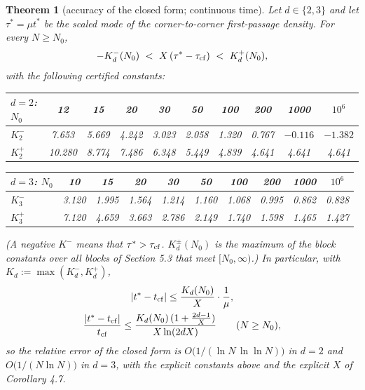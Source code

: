 \documentclass[11pt,a4paper]{article}
\newtheorem{theorem}{Theorem}[section]
\theoremstyle{definition}
\theoremstyle{remark}
\begin{document}
\begin{theorem}[{accuracy of the closed form; continuous time}]
Let $d\in\{2,3\}$ and let $\tau^*=\mu t^*$ be the scaled mode of the corner-to-corner first-passage density. For every $N\ge N_0$,
\begin{equation*}
-K^-_d(N_0)\ <\ X\,(\tau^*-\tau_{\rm cf})\ <\ K^+_d(N_0),
\end{equation*}
with the following certified constants:

\begin{center}\small
\begin{tabular}{lccccccccc}
\toprule
$d=2$: $N_0$ & 12 & 15 & 20 & 30 & 50 & 100 & 200 & 1000 & $10^6$ \\ \midrule
$K^-_2$ & 7.653 & 5.669 & 4.242 & 3.023 & 2.058 & 1.320 & 0.767 & $-0.116$ & $-1.382$ \\
$K^+_2$ & 10.280 & 8.774 & 7.486 & 6.348 & 5.449 & 4.839 & 4.641 & 4.641 & 4.641 \\
\bottomrule
\end{tabular}
\end{center}

\begin{center}\small
\begin{tabular}{lccccccccc}
\toprule
$d=3$: $N_0$ & 10 & 15 & 20 & 30 & 50 & 100 & 200 & 1000 & $10^6$ \\ \midrule
$K^-_3$ & 3.120 & 1.995 & 1.564 & 1.214 & 1.160 & 1.068 & 0.995 & 0.862 & 0.828 \\
$K^+_3$ & 7.120 & 4.659 & 3.663 & 2.786 & 2.149 & 1.740 & 1.598 & 1.465 & 1.427 \\
\bottomrule
\end{tabular}
\end{center}

(A negative $K^-$ means that $\tau^*>\tau_{\rm cf}$. $K^\pm_d(N_0)$ is the maximum of the block constants over all blocks of Section 5.3 that meet $[N_0,\infty)$.)
In particular, with $K_d:=\max(K_d^-,K_d^+)$,
\begin{gather*}
|t^*-t_{\rm cf}|\le\frac{K_d(N_0)}{X}\cdot\frac1\mu, \\
\frac{|t^*-t_{\rm cf}|}{t_{\rm cf}}\le\frac{K_d(N_0)\,(1+\frac{2d-1}{X})}{X\ln(2dX)} \qquad (N\ge N_0),
\end{gather*}
so the relative error of the closed form is $O\bigl(1/(\ln N\,\ln\ln N)\bigr)$ in $d=2$ and $O\bigl(1/(N\ln N)\bigr)$ in $d=3$, with the explicit constants above and the explicit $X$ of Corollary 4.7.
\end{theorem}
\end{document}
